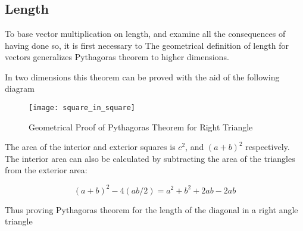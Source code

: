 
%



%
%

\chapter{} %



\section{Length}

To base vector multiplication on length, and examine all the consequences of having done so, it is first necessary to 
The geometrical definition of length for vectors generalizes Pythagoras theorem to higher dimensions.

In two dimensions this theorem can be proved with the aid of the following diagram

\begin{figure}[htp]
\centering
\texttt{[image: square\_in\_square]}
\caption{Geometrical Proof of Pythagoras Theorem for Right Triangle}\label{fig:phthagoras}
\end{figure}

The area of the interior and exterior squares is $c^2$, and $(a+b)^2$ respectively.  The interior area can also be calculated by subtracting the area of the triangles from the exterior area:

\[
(a+b)^2 - 4(ab/2) = a^2 + b^2 + 2ab - 2ab
\]

Thus proving Pythagoras theorem for the length of the diagonal in a right angle triangle

